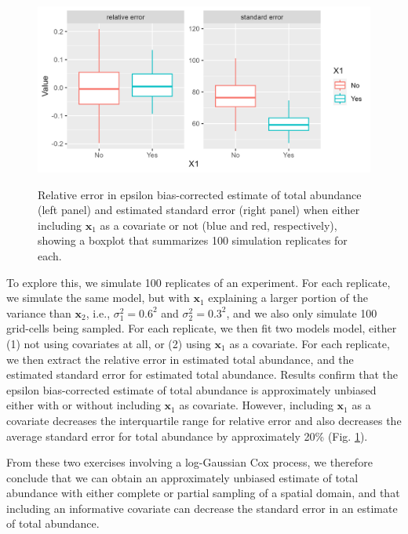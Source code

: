 \begin{figure}[!ht]
    \caption[Simulation experiment comparing SDM with and without covariate]{Relative error in epsilon bias-corrected estimate of total abundance (left panel) and estimated standard error (right panel) when either including \(\mathbf{x}_1\) as a covariate or not (blue and red, respectively), showing a boxplot that summarizes 100 simulation replicates for each.}
    \centering
    \includegraphics[width=5.5in]{Chap_7/Simulation_results.png}
    \label{fig:Chap7_simulation_results}
\end{figure}

To explore this, we simulate 100 replicates of an experiment.  For each replicate, we simulate the same model, but with \(\mathbf{x}_1\) explaining a larger portion of the variance than \(\mathbf{x}_2\), i.e., \(\sigma_1^2=0.6^2\) and \(\sigma_2^2=0.3^2\), and we also only simulate 100 grid-cells being sampled. For each replicate, we then fit two models model, either (1) not using covariates at all, or (2) using \(\mathbf{x}_1\) as a covariate.  For each replicate, we then extract the relative error in estimated total abundance, and the estimated standard error for estimated total abundance.  Results confirm that the epsilon bias-corrected estimate of total abundance is approximately unbiased either with or without including \(\mathbf{x}_1\) as covariate.  However, including \(\mathbf{x}_1\) as a covariate decreases the interquartile range for relative error and also decreases the average standard error for total abundance by approximately 20\% (Fig. \ref{fig:Chap7_simulation_results}).

From these two exercises involving a log-Gaussian Cox process, we therefore conclude that we can obtain an approximately unbiased estimate of total abundance with either complete or partial sampling of a spatial domain, and that including an informative covariate can decrease the standard error in an estimate of total abundance.  

